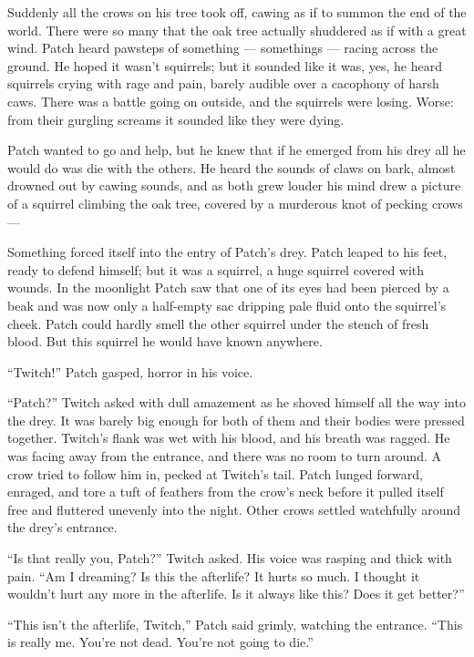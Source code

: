 \documentclass[ebook,oneside,openany,12pt]{memoir}
\begin{document}
Suddenly all the crows on his tree took off, cawing as if to summon
the end of the world. There were so many that the oak tree actually
shuddered as if with a great wind. Patch heard pawsteps of something —
somethings — racing across the ground. He hoped it wasn’t squirrels;
but it sounded like it was, yes, he heard squirrels crying with rage
and pain, barely audible over a cacophony of harsh caws. There was a
battle going on outside, and the squirrels were losing. Worse: from
their gurgling screams it sounded like they were dying.

Patch wanted to go and help, but he knew that if he emerged from his
drey all he would do was die with the others. He heard the sounds of
claws on bark, almost drowned out by cawing sounds, and as both grew
louder his mind drew a picture of a squirrel climbing the oak tree,
covered by a murderous knot of pecking crows —

Something forced itself into the entry of Patch’s drey. Patch leaped
to his feet, ready to defend himself; but it was a squirrel, a huge
squirrel covered with wounds. In the moonlight Patch saw that one of
its eyes had been pierced by a beak and was now only a half-empty sac
dripping pale fluid onto the squirrel’s cheek. Patch could hardly
smell the other squirrel under the stench of fresh blood. But this
squirrel he would have known anywhere.

“Twitch!” Patch gasped, horror in his voice.

“Patch?” Twitch asked with dull amazement as he shoved himself all the
way into the drey. It was barely big enough for both of them and their
bodies were pressed together. Twitch’s flank was wet with his blood,
and his breath was ragged. He was facing away from the entrance, and
there was no room to turn around. A crow tried to follow him in,
pecked at Twitch’s tail. Patch lunged forward, enraged, and tore a
tuft of feathers from the crow’s neck before it pulled itself free and
fluttered unevenly into the night. Other crows settled watchfully
around the drey’s entrance.

“Is that really you, Patch?” Twitch asked. His voice was rasping and
thick with pain. “Am I dreaming? Is this the afterlife? It hurts so
much. I thought it wouldn’t hurt any more in the afterlife. Is it
always like this? Does it get better?”

“This isn’t the afterlife, Twitch,” Patch said grimly, watching the
entrance. “This is really me. You’re not dead. You’re not going to
die.”
\end{document}
